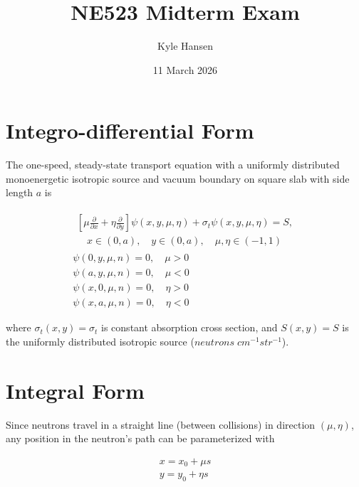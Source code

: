 \documentclass{midterm-template}
\title{NE523 Midterm Exam}
\author{Kyle Hansen}
\date{11 March 2026}
\begin{document}
\maketitle{}

\section{Integro-differential Form}

The one-speed, steady-state transport equation with a uniformly distributed monoenergetic isotropic source and vacuum boundary on square slab with side length $a$ is

\begin{subequations}
   \begin{gather}
    \begin{split}
        \left[\mu \frac{\partial}{\partial x} + \eta \frac{\partial}{\partial y} \right]\psi(x, y, \mu, \eta) + \sigma_t \psi(x, y, \mu, \eta) = S,\\ \quad x \in (0, a), \quad y \in (0,  a), \quad \mu, \eta \in (-1, 1) \label{eq:integro-differential}
    \end{split}\\
    \psi(0, y, \mu, n) = 0, \quad \mu > 0\\
    \psi(a, y, \mu, n) = 0, \quad \mu < 0\\
    \psi(x, 0, \mu, n) = 0, \quad \eta > 0\\
    \psi(x, a, \mu, n) = 0, \quad \eta < 0
\end{gather} 
\end{subequations}

where $\sigma_t(x, y) = \sigma_t$ is constant absorption cross section, and $S(x, y) = S$ is the uniformly distributed isotropic source ($neutrons \; cm^{-1} str^{-1}$).

\section{Integral Form}

Since neutrons travel in a straight line (between collisions) in direction $(\mu, \eta)$, any position in the neutron's path can be parameterized with 

\begin{subequations}\label{eq:parameterization}
    \begin{gather}
        x = x_0 + \mu s\\
         y = y_0 + \eta s
    \end{gather}
\end{subequations}
\end{document}
